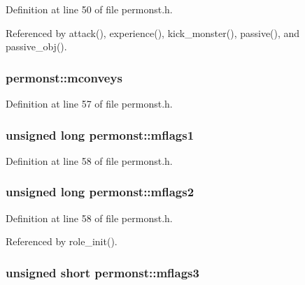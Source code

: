 Definition at line 50 of file permonst.\+h.



Referenced by attack(), experience(), kick\+\_\+monster(), passive(), and passive\+\_\+obj().

\hypertarget{structpermonst_aa8e81f6e7e10c01a25f928e95816fc7b}{
\subsubsection[{mconveys}]{ permonst\+::mconveys}}\label{structpermonst_aa8e81f6e7e10c01a25f928e95816fc7b}


Definition at line 57 of file permonst.\+h.

\hypertarget{structpermonst_ae298930e8d2da56fa608c05a76d073e2}{
\subsubsection[{mflags1}]{\setlength{\rightskip}{0pt plus 5cm}unsigned long permonst\+::mflags1}}\label{structpermonst_ae298930e8d2da56fa608c05a76d073e2}


Definition at line 58 of file permonst.\+h.

\hypertarget{structpermonst_ad620729c9694b29047996af4e5380030}{
\subsubsection[{mflags2}]{\setlength{\rightskip}{0pt plus 5cm}unsigned long permonst\+::mflags2}}\label{structpermonst_ad620729c9694b29047996af4e5380030}


Definition at line 58 of file permonst.\+h.



Referenced by role\+\_\+init().

\hypertarget{structpermonst_ac5987c08238b33d93531fb396b0d98db}{
\subsubsection[{mflags3}]{\setlength{\rightskip}{0pt plus 5cm}unsigned short permonst\+::mflags3}}\label{structpermonst_ac5987c08238b33d93531fb396b0d98db}


